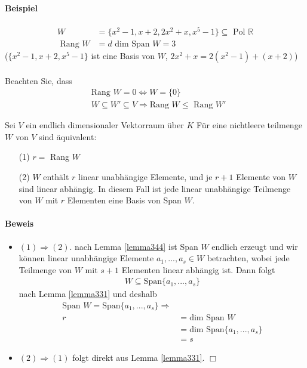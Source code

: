\documentclass[11pt]{report}
\newcommand*\Zb[1] {\mathbb{#1}}
\begin{document}
\paragraph{Beispiel}
\begin{align}
 W &= \{x^2-1, x+2, 2x^2+x, x^5-1\} \subseteq \text{ Pol } \Zb{R} \\
 \text{ Rang } W &= d\text{ dim Span } W = 3
\end{align}
($\{x^2-1, x+2, x^5-1\}$ ist eine Basis von $W$, $2x^2+x = 2(x^2-1) + (x+2)$)\\\\
Beachten Sie, dass
\begin{align}
 &\text{Rang } W = 0 \Leftrightarrow W = \{0\}\\
 &W \subseteq W' \subseteq V \Rightarrow \text{Rang } W \leq \text{ Rang } W'
\end{align}

\begin{satz}
 \label{satz345}
Sei $V$ ein endlich dimensionaler Vektorraum über $K$ Für eine nichtleere teilmenge $W$ von $V$ sind äquivalent:
\begin{itemize}
 \item[(1)] $r = $ Rang $W$
 \item[(2)] $W$ enthält $r$ linear unabhängige Elemente, und je $r+1$ Elemente von $W$ sind linear abhängig. In diesem Fall ist jede linear unabhängige Teilmenge von $W$ mit $r$ Elementen eine Basis von Span $W$.
\end{itemize}
\end{satz}

\paragraph{Beweis}
\begin{itemize}
 \item $(1) \Rightarrow (2)$. nach Lemma \ref{lemma344} ist Span $W$ endlich erzeugt und wir können linear unabhängige Elemente $a_1, ..., a_s \in W$ betrachten, wobei jede Teilmenge von $W$ mit $s+1$ Elementen linear abhängig ist. Dann folgt 
\begin{align}
 W \subseteq \text{Span}\{a_1, ..., a_s\}
\end{align}
nach Lemma \ref{lemma331} und deshalb
\begin{align}
 \text{Span } W = \text{Span}\{a_1, ..., a_s\} \Rightarrow \\
r &= \text{dim Span } W \\
  &= \text{dim Span}\{a_1, ..., a_s\} \\
  &= s
\end{align}
\item $(2) \Rightarrow (1)$ folgt direkt aus Lemma \ref{lemma331}. \hfill $\Box$
\end{itemize}
\end{document}
